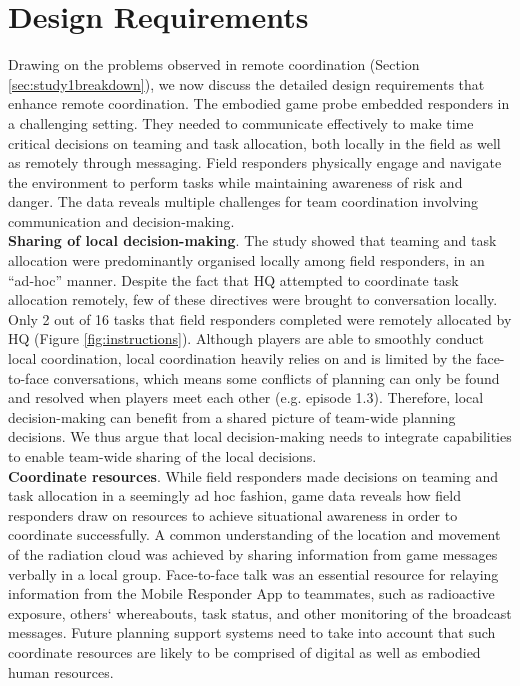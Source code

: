 

\section{Design Requirements}\label{sec:study1requirements}
Drawing on the problems observed in remote coordination (Section \ref{sec:study1breakdown}), we now discuss the detailed design requirements that enhance remote coordination. The embodied game probe embedded responders in a challenging setting. They needed to communicate effectively to make time critical decisions on teaming and task allocation, both locally in the field as well as remotely through messaging. Field responders physically engage and navigate the environment to perform tasks while maintaining awareness of risk and danger. The data reveals multiple challenges for team coordination involving communication and decision-making. \\

\textbf{Sharing of local decision-making}. The study showed that teaming and task allocation were predominantly organised locally among field responders, in an ``ad-hoc'' manner. Despite the fact that HQ attempted to coordinate task allocation remotely, few of these directives were brought to conversation locally. Only 2 out of 16 tasks that field responders completed were remotely allocated by HQ (Figure \ref{fig:instructions}). Although players are able to smoothly conduct local coordination, local coordination heavily relies on and is limited by the face-to-face conversations, which means some conflicts of planning can only be found and resolved when players meet each other (e.g. episode 1.3). Therefore, local decision-making can benefit from a shared picture of team-wide planning decisions. We thus argue that local decision-making needs to integrate capabilities to enable team-wide sharing of the local decisions.\\

\textbf{Coordinate resources}. While field responders made decisions on teaming and task allocation in a seemingly ad hoc fashion, game data reveals how field responders draw on resources to achieve situational awareness in order to coordinate successfully. A common understanding of the location and movement of the radiation cloud was achieved by sharing information from game messages verbally in a local group. Face-to-face talk was an essential resource for relaying information from the Mobile Responder App to teammates, such as radioactive exposure, others` whereabouts, task status, and other monitoring of the broadcast messages. Future planning support systems need to take into account that such coordinate resources are likely to be comprised of digital as well as embodied human resources. \\

